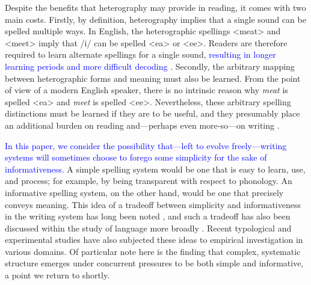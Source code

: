 \documentclass[doc,biblatex]{apa7}
\newcommand\newmaterial[1]{\textcolor{blue}{#1}}
\begin{document}
Despite the benefits that heterography may provide in reading, it comes with two main costs. Firstly, by definition, heterography implies that a single sound can be spelled multiple ways. In English, the heterographic spellings <meat> and <meet> imply that /i/ can be spelled <ea> or <ee>. Readers are therefore required to learn alternate spellings for a single sound, \newmaterial{resulting in longer learning periods and more difficult decoding \parencite{Reis:2020, Seymour:2003, Spencer:2003, Taylor:2011, Zhao:2018}}. Secondly, the arbitrary mapping between heterographic forms and meaning must also be learned. From the point of view of a modern English speaker, there is no intrinsic reason why \textit{meat} is spelled <ea> and \textit{meet} is spelled <ee>. Nevertheless, these arbitrary spelling distinctions must be learned if they are to be useful, and they presumably place an additional burden on reading and---perhaps even more-so---on writing \parencite{Frith:1979, Shankweiler:1992}.

\newmaterial{In this paper, we consider the possibility that---left to evolve freely---writing systems will sometimes choose to forego some simplicity for the sake of informativeness.} A simple spelling system would be one that is easy to learn, use, and process; for example, by being transparent with respect to phonology. An informative spelling system, on the other hand, would be one that precisely conveys meaning. This idea of a tradeoff between simplicity and informativeness in the writing system has long been noted \parencite[e.g.,][]{Coulmas:1991}, and such a tradeoff has also been discussed within the study of language more broadly \parencite[e.g.,][]{Gabelentz:1891, Zipf:1949, Martinet:1952, Rosch:1978}. Recent typological \parencite[e.g.,][]{Kemp:2018} and experimental \parencite[e.g.,][]{Kirby:2015} studies have also subjected these ideas to empirical investigation in various domains. Of particular note here is the finding that complex, systematic structure emerges under concurrent pressures to be both simple and informative, a point we return to shortly.
\end{document}
